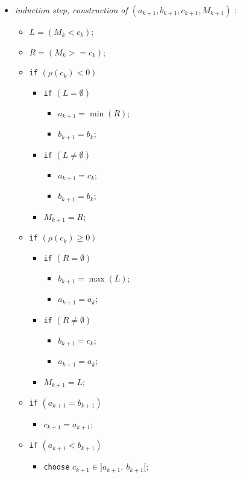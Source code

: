 \documentclass[
  11pt,
  a4paper,
]{article}
\begin{document}
\begin{itemize}
	
	\item[Step-3]  \textit{induction step, construction of $\left(a_{k+1},b_{k+1},c_{k+1},M_{k+1} \right)$  }:
	\begin{itemize}
		\item[$\bullet$] $L=(M_k<c_k);$
		\item[$\bullet$] $R=(M_k>=c_k);$ 	           
		
		\item[$\bullet$] \texttt{if} $(\rho(c_k)<0)$
		\begin{itemize}
			\item[$\circ$]  \texttt{if} $(L=\emptyset)$
			\begin{itemize}
				\item[$\diamond$]  $a_{k+1}=\min(R);$
				\item[$\diamond$] $b_{k+1}=b_k;$
			\end{itemize}             
			\item[$\circ$] \texttt{if} $(L\neq\emptyset)$ 
			\begin{itemize} 
				\item[$\diamond$] $a_{k+1}=c_k;$
				\item[$\diamond$] $b_{k+1}=b_k;$
			\end{itemize}    
			\item[$\circ$] $M_{k+1}=R;$
		\end{itemize}     
		\item[$\bullet$] \texttt{if} $(\rho(c_k)\ge 0)$  
		\begin{itemize}			  
			\item[$\circ$] \texttt{if} $(R=\emptyset)$
			\begin{itemize}
				\item[$\diamond$] $b_{k+1}=\max(L);$
				\item[$\diamond$] $a_{k+1}=a_k;$
			\end{itemize}   
			\item[$\circ$] \texttt{if} $(R\neq\emptyset)$
			\begin{itemize}
				\item[$\diamond$] $b_{k+1}=c_k;$
				\item[$\diamond$] $a_{k+1}= a_k;$
			\end{itemize}    
			\item[$\circ$] $M_{k+1}=L;$
		\end{itemize} 
		\item[$\bullet$] \texttt{if} $(a_{k+1}=b_{k+1})$
		\begin{itemize}
			\item[$\circ$] $c_{k+1}= a_{k+1};$
		\end{itemize}   
		\item[$\bullet$] \texttt{if} $(a_{k+1}<b_{k+1})$  
		\begin{itemize}
			\item[$\circ$] \texttt{choose} $c_{k+1}\in ]a_{k+1},\ b_{k+1}[;$	
		\end{itemize}
	\end{itemize}
	
	
\end{itemize} 	
\end{document}
